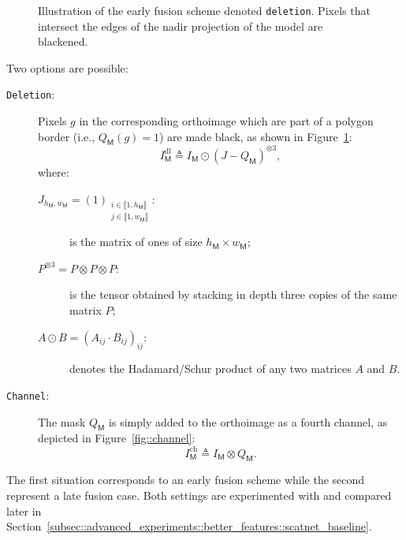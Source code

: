             \begin{figure}[htb]
                \centering
                
                \caption[
                    Illustration of the early fusion scheme denoted \texttt{deletion}.
                ]{
                    \label{fig::deletion}
                    Illustration of the early fusion scheme denoted \texttt{deletion}.
                    Pixels that intersect the edges of the nadir projection of the model are blackened.
                }
            \end{figure}

            Two options are possible:
            \begin{description}
                \item[\texttt{Deletion}:] Pixels \(g\) in the corresponding orthoimage which are part of a polygon border (i.e., \(Q_{\mathsf{M}}(g) = 1\)) are made black, as shown in Figure~\ref{fig::deletion}:
                        \begin{equation}
                            \label{eq::deletion_orthoimage}
                            I^{\text{dl}}_{\mathsf{M}} \triangleq I_{\mathsf{M}} \odot \left(J - Q_{\mathsf{M}}\right)^{\otimes 3},
                        \end{equation}
                        where:
                        \begin{description}
                            \item[\(J_{h_{\mathsf{M}}, w_{\mathsf{M}}} = \left(1\right)_{\substack{i \in \llbracket 1, h_\mathsf{M} \rrbracket\\j \in \llbracket 1, w_\mathsf{M} \rrbracket}} :\)] is the matrix of ones of size \(h_{\mathsf{M}} \times w_{\mathsf{M}}\);
                            \item[\(P^{\otimes 3} = P \otimes P \otimes P :\)] is the tensor obtained by stacking in depth three copies of the same matrix \(P\);
                            \item[\(A \odot B  = \left(A_{ij} \cdot B_{ij} \right)_{ij} :\)] denotes the Hadamard/Schur product of any two matrices \(A\) and \(B\).
                        \end{description}
                \item[\texttt{Channel}:] The mask \(Q_{\mathsf{M}}\) is simply added to the orthoimage as a fourth channel, as depicted in Figure~\ref{fig::channel}:
                        \begin{equation}
                            \label{eq::channel_orthoimage}
                            I^{\text{ch}}_{\mathsf{M}} \triangleq I_{\mathsf{M}} \otimes Q_{\mathsf{M}}.
                        \end{equation}
            \end{description}
            The first situation corresponds to an early fusion scheme while the second represent a late fusion case.
            Both settings are experimented with and compared later in Section~\ref{subsec::advanced_experiments::better_features::scatnet_baseline}.\\

